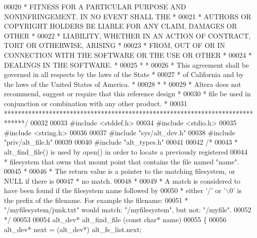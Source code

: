 \begin{DoxyCode}
00020 \textcolor{comment}{* FITNESS FOR A PARTICULAR PURPOSE AND NONINFRINGEMENT. IN NO EVENT SHALL THE *}
00021 \textcolor{comment}{* AUTHORS OR COPYRIGHT HOLDERS BE LIABLE FOR ANY CLAIM, DAMAGES OR OTHER      *}
00022 \textcolor{comment}{* LIABILITY, WHETHER IN AN ACTION OF CONTRACT, TORT OR OTHERWISE, ARISING     *}
00023 \textcolor{comment}{* FROM, OUT OF OR IN CONNECTION WITH THE SOFTWARE OR THE USE OR OTHER         *}
00024 \textcolor{comment}{* DEALINGS IN THE SOFTWARE.                                                   *}
00025 \textcolor{comment}{*                                                                             *}
00026 \textcolor{comment}{* This agreement shall be governed in all respects by the laws of the State   *}
00027 \textcolor{comment}{* of California and by the laws of the United States of America.              *}
00028 \textcolor{comment}{*                                                                             *}
00029 \textcolor{comment}{* Altera does not recommend, suggest or require that this reference design    *}
00030 \textcolor{comment}{* file be used in conjunction or combination with any other product.          *}
00031 \textcolor{comment}{******************************************************************************/}
00032 
00033 \textcolor{preprocessor}{#include <stddef.h>}
00034 \textcolor{preprocessor}{#include <stdio.h>}
00035 \textcolor{preprocessor}{#include <string.h>}
00036 
00037 \textcolor{preprocessor}{#include "sys/alt_dev.h"}
00038 \textcolor{preprocessor}{#include "priv/alt_file.h"}
00039 
00040 \textcolor{preprocessor}{#include "alt_types.h"}
00041 
00042 \textcolor{comment}{/* }
00043 \textcolor{comment}{ * alt\_find\_file() is used by open() in order to locate a previously registered }
00044 \textcolor{comment}{ * filesystem that owns that mount point that contains the file named "name". }
00045 \textcolor{comment}{ *}
00046 \textcolor{comment}{ * The return value is a pointer to the matching filesystem, or NULL if there is}
00047 \textcolor{comment}{ * no match. }
00048 \textcolor{comment}{ *}
00049 \textcolor{comment}{ * A match is considered to have been found if the filesystem name followed by}
00050 \textcolor{comment}{ * either '/' or '\(\backslash\)0' is the prefix of the filename. For example the filename:}
00051 \textcolor{comment}{ * "/myfilesystem/junk.txt" would match: "/myfilesystem", but not: "/myfile". }
00052 \textcolor{comment}{ */}
00053  
00054 alt_dev* alt_find_file (\textcolor{keyword}{const} \textcolor{keywordtype}{char}* name)
00055 \{
00056   alt_dev* next = (alt_dev*) alt_fs_list.next;   

\end{DoxyCode}
